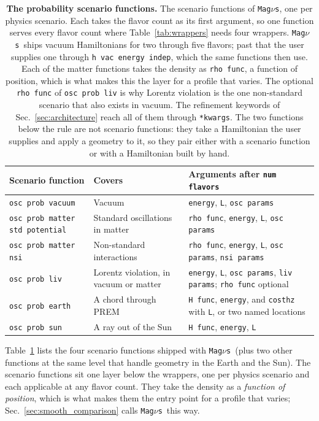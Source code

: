 \documentclass[final,5p,times,twocolumn,sort,compress]{elsarticle}
\makeatletter
\DeclareRobustCommand{\_}{%
  \ifmmode\nfss@text{\textunderscore}\else\textunderscore\allowbreak\fi}
\newcommand{\Tab}{Table}
\newcommand{\tabl}[1]{\Tab~\ref{tab:#1}}
\newcommand{\magnus}{{\tt Mag}\ensuremath{\nu}{\tt s}}
\makeatother
\begin{document}
{\def\arraystretch{1.2}
\begin{table}[t!]
{\footnotesize
\begin{tabular}{@{}p{5.0cm}p{4.4cm}p{7.4cm}@{}}
 Scenario function & Covers & Arguments after {\tt num\_flavors} \\
 \hline
 {\tt osc\_prob\_vacuum} & Vacuum & {\tt energy}, {\tt L}, {\tt osc\_params} \\
 {\tt osc\_prob\_matter\_std\_potential} & Standard oscillations in matter & {\tt rho\_func}, {\tt energy}, {\tt L}, {\tt osc\_params} \\
 {\tt osc\_prob\_matter\_nsi} & Non-standard interactions & {\tt rho\_func}, {\tt energy}, {\tt L}, {\tt osc\_params}, {\tt nsi\_params} \\
 {\tt osc\_prob\_liv} & Lorentz violation, in vacuum or matter & {\tt energy}, {\tt L}, {\tt osc\_params}, {\tt liv\_params}; {\tt rho\_func} optional \\
 \hline
 {\tt osc\_prob\_earth} & A chord through PREM & {\tt H\_func}, {\tt energy}, and {\tt costhz} with {\tt L}, or two named locations \\
 {\tt osc\_prob\_sun} & A ray out of the Sun & {\tt H\_func}, {\tt energy}, {\tt L} \\
\end{tabular}}
\caption{\label{tab:scenarios}\textbf{The probability scenario functions.} The scenario functions of \magnus, one per physics scenario. Each takes the flavor count as its first argument, so one function serves every flavor count where \tabl{wrappers} needs four wrappers. \magnus\ ships vacuum Hamiltonians for two through five flavors; past that the user supplies one through {\tt h\_vac\_energy\_indep}, which the same functions then use. Each of the matter functions takes the density as {\tt rho\_func}, a function of position, which is what makes this the layer for a profile that varies. The optional {\tt rho\_func} of {\tt osc\_prob\_liv} is why Lorentz violation is the one non-standard scenario that also exists in vacuum. The refinement keywords of Sec.~\ref{sec:architecture} reach all of them through {\tt **kwargs}. The two functions below the rule are not scenario functions: they take a Hamiltonian the user supplies and apply a geometry to it, so they pair either with a scenario function or with a Hamiltonian built by hand.}
\end{table}}

\tabl{scenarios} lists the four scenario functions shipped with \magnus\ (plus two other functions at the same level that handle geometry in the Earth and the Sun). The scenario functions sit one layer below the wrappers, one per physics scenario and each applicable at any flavor count. They take the density as a \emph{function of position}, which is what makes them the entry point for a profile that varies; Sec.~\ref{sec:smooth_comparison} calls \magnus\ this way.
\end{document}
